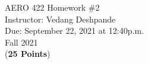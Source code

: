 \documentclass[]{article}
\begin{document}

\begin{center}
    {\Large AERO 422 Homework \#2}\\ %
    \vspace{0.2 cm}
    Instructor: Vedang Deshpande\\ %
    \vspace{0.2 cm}
    Due: September 22, 2021 at 12:40p.m.\\ %
    \vspace{0.2 cm}
    Fall 2021\\ %
    \vspace{0.2 cm}
    (\textbf{25 Points})\\
\end{center}

\vspace{0.2 cm}
\end{document}
